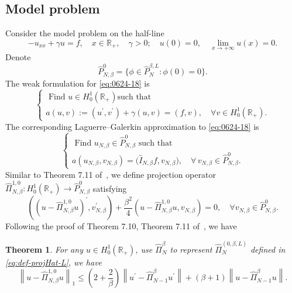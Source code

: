 \documentclass[pdflatex,sn-aps]{sn-jnl}%
\theoremstyle{thmstyleone}%
\newtheorem{theorem}{Theorem}[section]%
\theoremstyle{thmstyletwo}%
\theoremstyle{thmstylethree}%
\begin{document}
\subsection{Model problem}\label{subsec:model}
Consider the model problem on the half-line
\begin{equation}\label{eq:0624-18}
  -u_{x x}+\gamma u=f, \quad x \in \mathbb{R}_{+}, \quad \gamma>0 ; \quad u(0)=0, \quad \lim _{x \rightarrow+\infty} u(x)=0 .
\end{equation}
Denote
\begin{displaymath}
  \widehat{P}_{N,\beta}^0=\bigl\{\phi \in \widehat{P}_N^{\beta,L}: \phi(0)=0\bigr\} .
\end{displaymath}
The weak formulation for \eqref{eq:0624-18} is
\begin{equation}\label{eq:0624-19}
  \left\{\begin{array}{l}
  \text { Find } u \in H_0^1\left(\mathbb{R}_{+}\right) \text {such that } \\
  a(u, v):=\left(u^{\prime}, v^{\prime}\right)+\gamma(u, v)=(f, v), \quad \forall v \in H_0^1\left(\mathbb{R}_{+}\right).
  \end{array}\right.
\end{equation}
The corresponding Laguerre--Galerkin approximation to \eqref{eq:0624-18} is
\begin{equation}\label{eq:0624-20}
  \left\{\begin{array}{l}
  \text { Find } u_{N,\beta} \in \widehat{P}_{N,\beta}^0 \text { such that } \\
  a\left(u_{N,\beta}, v_{N,\beta}\right)=\bigl(\widehat{I}_{N,\beta} f, v_{N,\beta}\bigr), 
  \quad \forall \,v_{N,\beta} \in \widehat{P}_{N,\beta}^0.
  \end{array}\right.
\end{equation}
Similar to Theorem 7.11 of~\cite{shen2011spectral}, we define projection
operator $\widehat{\Pi}_{N, \beta}^{1,0}: H_0^1\left(\mathbb{R}_{+}\right) \longrightarrow \widehat{P}_{N, \beta}^0$ satisfying
\begin{equation}\label{eq:0626-29}
  \left(\left(u-\widehat{\Pi}_{N, \beta}^{1,0} u\right)^{\prime}, v_{N, \beta}^{\prime}\right)+\frac{\beta^2}{4}\left(u-\widehat{\Pi}_{N, \beta}^{1,0} u , v_{N, \beta}\right)=0, \quad \forall v_{N, \beta} \in \widehat{P}_{N, \beta}^0.
\end{equation}
Following the proof of Theorem 7.10, Theorem 7.11 of~\cite{shen2011spectral}, 
we have
\begin{theorem}\label{thm:0626-thm2}
  For any $u \in H_0^1\left(\mathbb{R}_{+}\right)$, use $\widehat{\Pi}_N^\beta$
  to represent $\widehat{\Pi}_{N}^{(0,\beta,L)}$ defined in \eqref{eq:def-projHat-L}, we have
  \begin{equation}
    \left\|u-\widehat{\Pi}_{N, \beta}^{1,0} u\right\|_1 \leqslant\left(2+\frac{2}{\beta}\right)\left\|u^{\prime}-\widehat{\Pi}_{N-1}^\beta u^{\prime}\right\|+(\beta+1)\left\|u-\widehat{\Pi}_{N-1}^\beta u\right\|.
  \end{equation}
\end{theorem}
\end{document}
